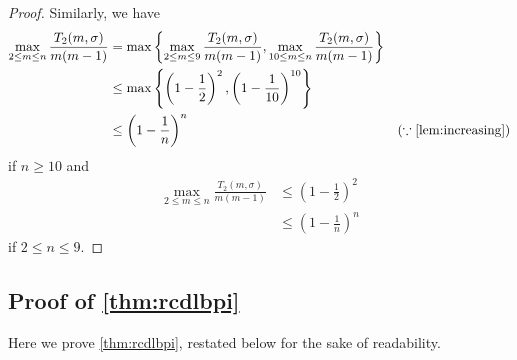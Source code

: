 \documentclass{article}
\theoremstyle{plain}
\theoremstyle{definition}
\theoremstyle{remark}
\def\bigopen#1{\left(#1\right)}
\def\bigset#1{\left\{#1\right\}}
\begin{document}
\begin{proof}
Similarly, we have 
\begin{align*}
    \max_{2\le m\le n} \frac{T_2(m, \sigma)}{m(m-1)} &= \max \bigset{\max_{2\le m\le 9}\frac{T_2(m, \sigma)}{m(m-1)}, \max_{10\le m\le n} \frac{T_2(m, \sigma)}{m(m-1)}} \\
    &\le \max\bigset{\bigopen{1-\frac{1}{2}}^2, \bigopen{1-\frac{1}{10}}^{10}} \\
    &\le \bigopen{1-\frac{1}{n}}^n & (\because \text{\cref{lem:increasing}})
\end{align*}
if $n\ge 10$ and 
\begin{align*}
    \max_{2\le m\le n} \frac{T_2(m, \sigma)}{m(m-1)} &\le \bigopen{1-\frac{1}{2}}^2\\
    &\le \bigopen{1-\frac{1}{n}}^n
\end{align*}
if $2\le n \le 9$.

\end{proof}

\subsection{Proof of \cref{thm:rcdlbpi}}
\label{subsec:rcdlbpi}

Here we prove \cref{thm:rcdlbpi}, restated below for the sake of readability.

\thmrcdlbpi*
\end{document}
